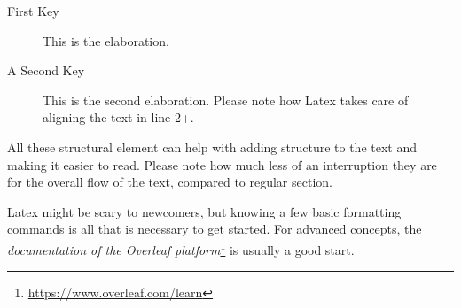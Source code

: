 \begin{description}
\item [First Key] This is the elaboration.
\item [A Second Key] This is the second elaboration. Please note how Latex takes care of aligning the text in line 2+.
\end{description}

All these structural element can help with adding structure to the text and making it easier to read.
Please note how much less of an interruption they are for the overall flow of the text, compared to regular section.

Latex might be scary to newcomers, but knowing a few basic formatting commands is all that is necessary to get started.
For advanced concepts, the \emph{documentation of the Overleaf platform}\footnote{\url{https://www.overleaf.com/learn}} is usually a good start.
